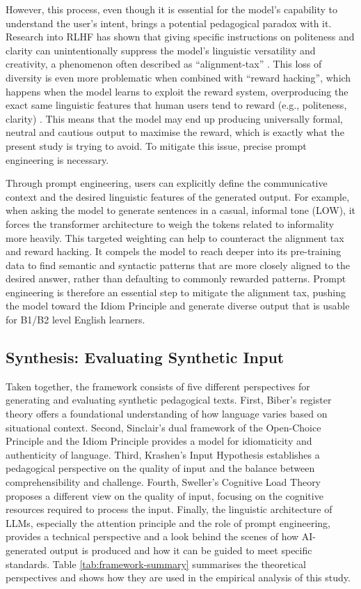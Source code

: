 \documentclass[11pt,a4paper]{article}
\begin{document}
However, this process, even though it is essential for the model's capability to understand the user's intent, brings a potential pedagogical paradox with it. Research into RLHF has shown that giving specific instructions on politeness and clarity can unintentionally suppress the model's linguistic versatility and creativity, a phenomenon often described as ``alignment-tax'' \parencite{ouyangTrainingLanguageModels2022}. This loss of diversity is even more problematic when combined with ``reward hacking'', which happens when the model learns to exploit the reward system, overproducing the exact same linguistic features that human users tend to reward (e.g., politeness, clarity) \parencite{amodeiConcreteProblemsAI2016}. This means that the model may end up producing universally formal, neutral and cautious output to maximise the reward, which is exactly what the present study is trying to avoid. To mitigate this issue, precise prompt engineering is necessary.

Through prompt engineering, users can explicitly define the communicative context and the desired linguistic features of the generated output. For example, when asking the model to generate sentences in a casual, informal tone (LOW), it forces the transformer architecture to weigh the tokens related to informality more heavily. This targeted weighting can help to counteract the alignment tax and reward hacking. It compels the model to reach deeper into its pre-training data to find semantic and syntactic patterns that are more closely aligned to the desired answer, rather than defaulting to commonly rewarded patterns. Prompt engineering is therefore an essential step to mitigate the alignment tax, pushing the model toward the Idiom Principle and generate diverse output that is usable for B1/B2 level English learners.

\subsection{Synthesis: Evaluating Synthetic Input}\label{subsec:synthesis-framework}

Taken together, the framework consists of five different perspectives for generating and evaluating synthetic pedagogical texts. First, Biber's register theory offers a foundational understanding of how language varies based on situational context. Second, Sinclair's dual framework of the Open-Choice Principle and the Idiom Principle provides a model for idiomaticity and authenticity of language. Third, Krashen's Input Hypothesis establishes a pedagogical perspective on the quality of input and the balance between comprehensibility and challenge. Fourth, Sweller's Cognitive Load Theory proposes a different view on the quality of input, focusing on the cognitive resources required to process the input. Finally, the linguistic architecture of LLMs, especially the attention principle and the role of prompt engineering, provides a technical perspective and a look behind the scenes of how AI-generated output is produced and how it can be guided to meet specific standards. Table \ref{tab:framework-summary} summarises the theoretical perspectives and shows how they are used in the empirical analysis of this study.
\end{document}

